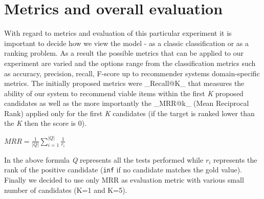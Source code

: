 \documentclass[11pt]{article}
\begin{document}
    \hypertarget{metrics-and-overall-evaluation}{%
\section{Metrics and overall
evaluation}\label{metrics-and-overall-evaluation}}

With regard to metrics and evaluation of this particular experiment it
is important to decide how we view the model - as a classic
classification or as a ranking problem. As a result the possible metrics
that can be applied to our experiment are varied and the options range
from the classification metrics such as accuracy, precision, recall,
F-score up to recommender systems domain-specific metrics. The initially
proposed metrics were \_Recall@K\_ that measures the ability of our
system to recommend viable items within the first \emph{K} proposed
candidates as well as the more importantly the \_MRR@k\_ (Mean
Reciprocal Rank) applied only for the first \emph{K} candidates (if the
target is ranked lower than the \emph{K} then the score is 0).

\(MRR = \frac{1}{|Q|}\sum\limits_{i=1}^{|Q|} \frac{1}{r_i}\)

In the above formula \emph{Q} represents all the tests performed while
\(r_i\) represents the rank of the positive candidate (\texttt{inf} if
no candidate matches the gold value). Finally we decided to use only MRR
as evaluation metric with various small number of candidates (K=1 and
K=5).
\end{document}
